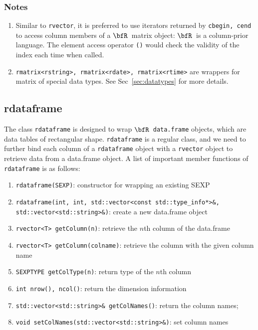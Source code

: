\documentclass{article}
\newcommand{\R}{$\bfR$}
\begin{document}
\subsubsection*{Notes}

\begin{enumerate}
  \item Similar to \texttt{rvector}, it is preferred to use
    iterators returned by \texttt{cbegin, cend} to access
    column members of a \R\ matrix object: \R\ is a
    column-prior language.  The element access operator
    \texttt{()} would check the validity of the index each
    time when called.
  \item \texttt{rmatrix<rstring>, rmatrix<rdate>,
    rmatrix<rtime>} are wrappers for matrix of special data
    types. See Sec~\ref{sec:datatypes} for more details.
\end{enumerate}

\subsection{rdataframe}

The class \texttt{rdataframe} is designed to wrap \R\
\texttt{data.frame} objects, which are data tables of
rectangular shape. \texttt{rdataframe} is a regular class,
and we need to further bind each column of a
\texttt{rdataframe} object with a \texttt{rvector} object to
retrieve data from a data.frame object.  A list of important
member functions of \texttt{rdataframe} is as follows:
\begin{enumerate}
  \item \texttt{rdataframe(SEXP)}: constructor for wrapping
    an existing SEXP
  \item \texttt{rdataframe(int, int, std::vector<const
    std::type\_info*>\&, std::vector<std::string>\&)}: create
    a new data.frame object
  \item \texttt{rvector<T> getColumn(n)}: retrieve the $n$th
    column of the data.frame
  \item \texttt{rvector<T> getColumn(colname)}: retrieve the
    column with the given column name
  \item \texttt{SEXPTYPE getColType(n)}: return type of the $n$th column

  \item \texttt{int nrow(), ncol()}: return the dimension information
  \item \texttt{std::vector<std::string>\& getColNames()}:
    return the column names;
  \item \texttt{void setColNames(std::vector<std::string>\&)}: set column names
\end{enumerate}
\end{document}
